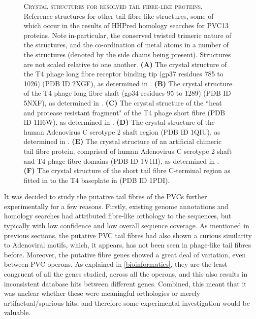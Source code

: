 \begin{figure}[p]
	\captionsetup{singlelinecheck=off, justification=justified, font=footnotesize, aboveskip=10pt}
	\caption[Existing resolved tail fibre protein structures]{\textsc{\normalsize Crystal structures for resolved tail fibre-like proteins.}\vspace{0.1cm} \newline Reference structures for other tail fibre like structures, some of which occur in the results of HHPred homology searches for PVC13 proteins. Note in-particular, the conserved twisted trimeric nature of the structures, and the co-ordination of metal atoms in a number of the structures (denoted by the side chains being present). Structures are not scaled relative to one another. \textbf{(A)} The crystal structure of the T4 phage long fibre receptor binding tip (gp37 residues 785 to 1026) (PDB ID 2XGF), as determined in \cite{Bartual2010}. \textbf{(B)} The crystal structure of the T4 phage long fibre shaft (gp34 residues 95 to 1289) (PDB ID 5NXF), as determined in \cite{Granell2014}. \textbf{(C)} The crystal structure of the ``heat and protease resistant fragment" of the T4 phage short fibre (PDB ID 1H6W), as determined in \cite{VanRaaij2001}. \textbf{(D)} The crystal structure of the human Adenovirus C serotype 2 shaft region (PDB ID 1QIU), as determined in \cite{VanRaaij1999}. \textbf{(E)} The crystal structure of an artificial chimeric tail fibre protein, comprised of human Adenovirus C serotype 2 shaft and T4 phage fibre domains (PDB ID 1V1H), as determined in \cite{Papanikolopoulou2004}. \textbf{(F)} The crystal structure of the short tail fibre C-terminal region as fitted in to the T4 baseplate in \cite{Kostyuchenko2003} (PDB ID 1PDI). }
	\label{tailfibrestructures}
\end{figure}


It was decided to study the putative tail fibres of the PVCs further experimentally for a few reasons. Firstly, existing genome annotations and homology searches had attributed fibre-like orthology to the sequences, but typically with low confidence and low overall sequence coverage. As mentioned in previous sections, the putative PVC tail fibres had also shown a curious similarity to Adenoviral motifs, which, it appears, has not been seen in phage-like tail fibres before. Moreover, the putative fibre genes showed a great deal of variation, even between PVC operons. As explained in \vref{bioinformatics}, they are the least congruent of all the genes studied, across all the operons, and this also results in inconsistent database hits between different genes. Combined, this meant that it was unclear whether these were meaningful orthologies or merely artifactual/spurious hits; and therefore some experimental investigation would be valuable.

